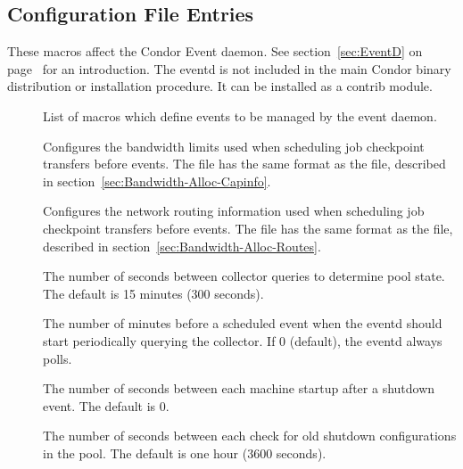 \subsection{\label{sec:Eventd-Config-File-Entries}
 Configuration File Entries}

These macros affect the Condor Event daemon.  See
section~\ref{sec:EventD} on page~\pageref{sec:EventD} for an
introduction.  The eventd is not included in the main Condor binary
distribution or installation procedure.  It can be installed as a
contrib module.

\begin{description}
  
\item[] \label{param:EventList} List of macros
which define events to be managed by the event daemon.

\item[] \label{param:EventdCapInfo}
Configures the bandwidth limits used when scheduling job checkpoint
transfers before  events.
The  file has the same
format as the  file, described in
section~\ref{sec:Bandwidth-Alloc-Capinfo}.

\item[] \label{param:EventdRouteInfo}
Configures the network routing information used when scheduling job
checkpoint transfers before  events.
The  file has the same
format as the  file, described in
section~\ref{sec:Bandwidth-Alloc-Routes}.

\item[] \label{param:EventdInterval} The number
of seconds between collector queries to determine pool
state.  The default is 15 minutes (300 seconds).

\item[]
\label{param:EventdMaxPreparation}  The number of minutes before a
scheduled event when the eventd should start periodically querying the
collector.  If 0 (default), the eventd always polls.

\item[]
\label{param:EventdShutdownSlowStartInterval} The number of seconds
between each machine startup after a shutdown event.  The default is 0.

\item[]
\label{param:EventdShutdownCleanupInterval} The number of seconds
between each check for old shutdown configurations in the pool.  The default
is one hour (3600 seconds).

\end{description}

